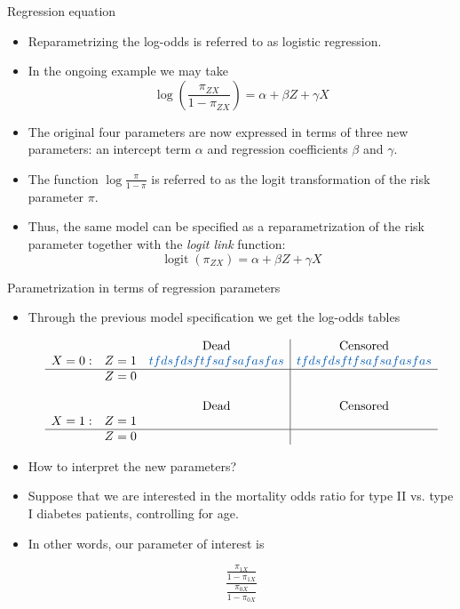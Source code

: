 \documentclass[10pt]{beamer}\usepackage[]{graphicx}\usepackage[]{color}
\begin{document}
\begin{frame}{Regression equation}
	\begin{itemize}
		\item Reparametrizing the log-odds is referred to as logistic regression.
		\item In the ongoing example we may take
		$$
		\log \left(\frac{\pi_{Z X}}{1-\pi_{Z X}}\right)=\alpha+\beta Z+\gamma X
		$$
		\item The original four parameters are now expressed in terms of three new parameters: an intercept term $\alpha$ and regression coefficients $\beta$ and $\gamma$.
		\item The function $\log \frac{\pi}{1-\pi}$ is referred to as the logit transformation of the risk parameter $\pi$.
		\item Thus, the same model can be specified as a reparametrization of the risk parameter together with the \textit{logit link} function:
		$$
		\operatorname{logit}\left(\pi_{Z X}\right)=\alpha+\beta Z+\gamma X
		$$
	\end{itemize}
\end{frame}





\begin{frame}{Parametrization in terms of regression parameters}
	\begin{itemize}
		\item Through the previous model specification we get the
		log-odds tables
		
				$$
		\begin{array}{llc|c} 
		&      & \text { Dead } & \text { Censored } \\
		X=0: & Z=1 & \textcolor{white}{tfdsfdsftfsafsafasfas} & \textcolor{white}{tfdsfdsftfsafsafasfas} \\
		\hline
		& Z=0 &  &  \\
		& & & \\
		&  & \text { Dead } & \text { Censored } \\
		X=1:&  Z=1 &  &  \\
				\hline
		&  Z=0    &  & 
		\end{array}
		$$
		
		\item How to interpret the new parameters?
		\item Suppose that we are interested in the mortality odds ratio for type II vs. type I diabetes patients, controlling for age.
		\item In other words, our parameter of interest is
		
		$$
		\frac{\frac{\pi_{1X}}{1-\pi_{1X}}}{\frac{\pi_{0X}}{1-\pi_{0X}}}
		$$
		
				
	\end{itemize}
\end{frame}
\end{document}

